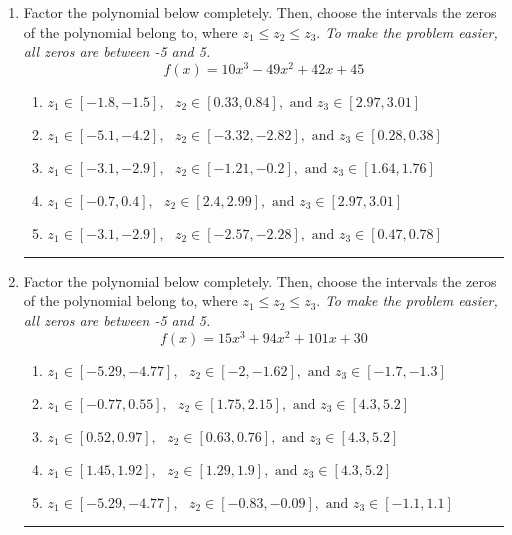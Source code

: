 \documentclass[14pt]{extbook}
\newcommand{\litem}[1]{\item#1\hspace*{-1cm}\rule{\textwidth}{0.4pt}}
\begin{document}
\begin{enumerate}
{\begin{enumerate}[label=\Alph*.]
\end{enumerate} }
\litem{
Factor the polynomial below completely. Then, choose the intervals the zeros of the polynomial belong to, where $z_1 \leq z_2 \leq z_3$. \textit{To make the problem easier, all zeros are between -5 and 5.}\[ f(x) = 10x^{3} -49 x^{2} +42 x + 45 \]\begin{enumerate}[label=\Alph*.]
\item \( z_1 \in [-1.8, -1.5], \text{   }  z_2 \in [0.33, 0.84], \text{   and   } z_3 \in [2.97, 3.01] \)
\item \( z_1 \in [-5.1, -4.2], \text{   }  z_2 \in [-3.32, -2.82], \text{   and   } z_3 \in [0.28, 0.38] \)
\item \( z_1 \in [-3.1, -2.9], \text{   }  z_2 \in [-1.21, -0.2], \text{   and   } z_3 \in [1.64, 1.76] \)
\item \( z_1 \in [-0.7, 0.4], \text{   }  z_2 \in [2.4, 2.99], \text{   and   } z_3 \in [2.97, 3.01] \)
\item \( z_1 \in [-3.1, -2.9], \text{   }  z_2 \in [-2.57, -2.28], \text{   and   } z_3 \in [0.47, 0.78] \)

\end{enumerate} }
\litem{
Factor the polynomial below completely. Then, choose the intervals the zeros of the polynomial belong to, where $z_1 \leq z_2 \leq z_3$. \textit{To make the problem easier, all zeros are between -5 and 5.}\[ f(x) = 15x^{3} +94 x^{2} +101 x + 30 \]\begin{enumerate}[label=\Alph*.]
\item \( z_1 \in [-5.29, -4.77], \text{   }  z_2 \in [-2, -1.62], \text{   and   } z_3 \in [-1.7, -1.3] \)
\item \( z_1 \in [-0.77, 0.55], \text{   }  z_2 \in [1.75, 2.15], \text{   and   } z_3 \in [4.3, 5.2] \)
\item \( z_1 \in [0.52, 0.97], \text{   }  z_2 \in [0.63, 0.76], \text{   and   } z_3 \in [4.3, 5.2] \)
\item \( z_1 \in [1.45, 1.92], \text{   }  z_2 \in [1.29, 1.9], \text{   and   } z_3 \in [4.3, 5.2] \)
\item \( z_1 \in [-5.29, -4.77], \text{   }  z_2 \in [-0.83, -0.09], \text{   and   } z_3 \in [-1.1, 1.1] \)


\end{enumerate}}
\end{enumerate}
\end{document}
